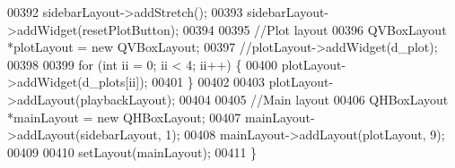 \begin{DoxyCode}
00392     sidebarLayout->addStretch();
00393     sidebarLayout->addWidget(resetPlotButton);
00394 
00395     \textcolor{comment}{//Plot layout}
00396     QVBoxLayout *plotLayout = \textcolor{keyword}{new} QVBoxLayout;
00397     \textcolor{comment}{//plotLayout->addWidget(d\_plot);}
00398 
00399     \textcolor{keywordflow}{for} (\textcolor{keywordtype}{int} ii = 0; ii < 4; ii++) \{
00400         plotLayout->addWidget(d\_plots[ii]);
00401     \}
00402 
00403     plotLayout->addLayout(playbackLayout);
00404 
00405     \textcolor{comment}{//Main layout}
00406     QHBoxLayout *mainLayout = \textcolor{keyword}{new} QHBoxLayout;
00407     mainLayout->addLayout(sidebarLayout, 1);
00408     mainLayout->addLayout(plotLayout, 9);
00409 
00410     setLayout(mainLayout);
00411 \}
\end{DoxyCode}
